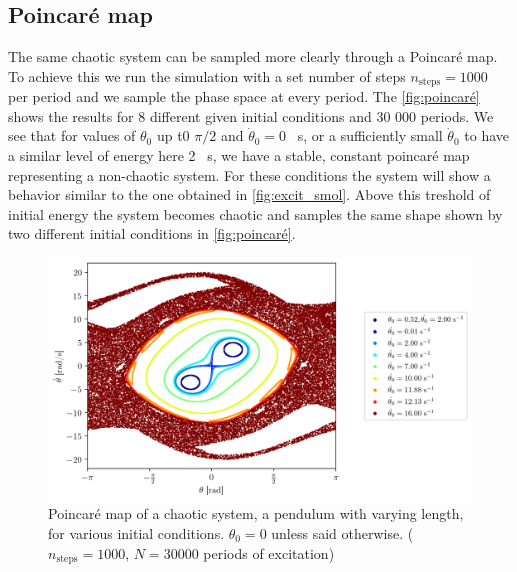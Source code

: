 \subsection{Poincaré map}
The same chaotic system can be sampled more clearly through a Poincaré map. To achieve this we run the simulation with a set number of steps $n_\mathrm{steps} = 1000$ per period and we sample the phase space at every period. The \autoref{fig:poincaré} shows the results for 8 different given initial conditions and 30 000 periods. We see that for values of $\theta_0$ up t0 $\pi / 2$ and $\dot\theta_0 = 0$ \si{\per\second}, or a sufficiently small $\dot\theta_0$ to have a similar level of energy here 2 \si{\per\second}, we have a stable, constant poincaré map representing a non-chaotic system. For these conditions the system will show a behavior similar to the one obtained in \autoref{fig:excit_smol}. Above this treshold of initial energy the system becomes chaotic and samples the same shape shown by two different initial conditions in \autoref{fig:poincaré}.
\begin{figure}[h]
    \centering
    \includegraphics[width=\linewidth]{figures/poincare_overkill.png}
    \caption{Poincaré map of a chaotic system, a pendulum with varying length, for various initial conditions. \(\theta_0=0\) unless said otherwise. (\(n_\textrm{steps}=1000\), \(N=30000\) periods of excitation)}
    \label{fig:poincaré}
\end{figure}





